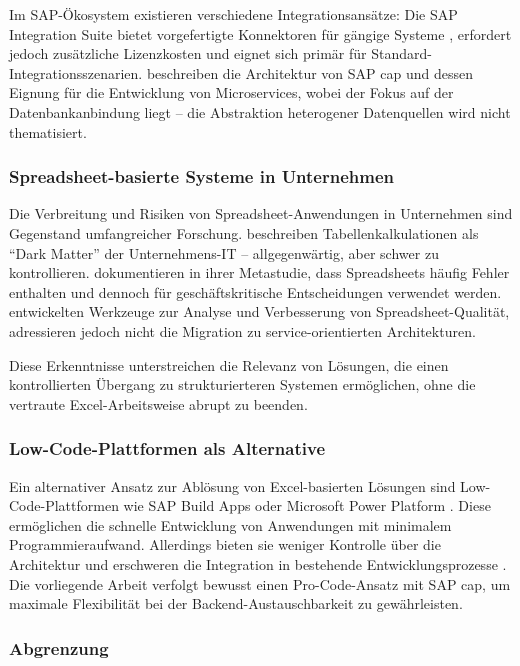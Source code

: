 Im SAP-Ökosystem existieren verschiedene Integrationsansätze: Die SAP Integration Suite bietet vorgefertigte Konnektoren für gängige Systeme \citep{sap2024btp}, erfordert jedoch zusätzliche Lizenzkosten und eignet sich primär für Standard-Integrationsszenarien. \cite{keller2019} beschreiben die Architektur von SAP \gls{cap} und dessen Eignung für die Entwicklung von Microservices, wobei der Fokus auf der Datenbankanbindung liegt -- die Abstraktion heterogener Datenquellen wird nicht thematisiert.

\subsubsection{Spreadsheet-basierte Systeme in Unternehmen}

Die Verbreitung und Risiken von Spreadsheet-Anwendungen in Unternehmen sind Gegenstand umfangreicher Forschung. \cite{panko2016} beschreiben Tabellenkalkulationen als \enquote{Dark Matter} der Unternehmens-IT -- allgegenwärtig, aber schwer zu kontrollieren. \cite{powell2009} dokumentieren in ihrer Metastudie, dass Spreadsheets häufig Fehler enthalten und dennoch für geschäftskritische Entscheidungen verwendet werden. \cite{hermans2015} entwickelten Werkzeuge zur Analyse und Verbesserung von Spreadsheet-Qualität, adressieren jedoch nicht die Migration zu service-orientierten Architekturen.

Diese Erkenntnisse unterstreichen die Relevanz von Lösungen, die einen kontrollierten Übergang zu strukturierteren Systemen ermöglichen, ohne die vertraute Excel-Arbeitsweise abrupt zu beenden.

\subsubsection{Low-Code-Plattformen als Alternative}

Ein alternativer Ansatz zur Ablösung von Excel-basierten Lösungen sind Low-Code-Plattformen wie SAP Build Apps oder Microsoft Power Platform \citep{sahay2020}. Diese ermöglichen die schnelle Entwicklung von Anwendungen mit minimalem Programmieraufwand. Allerdings bieten sie weniger Kontrolle über die Architektur und erschweren die Integration in bestehende Entwicklungsprozesse \citep{bock2021}. Die vorliegende Arbeit verfolgt bewusst einen Pro-Code-Ansatz mit SAP \gls{cap}, um maximale Flexibilität bei der Backend-Austauschbarkeit zu gewährleisten.

\subsubsection{Abgrenzung}

